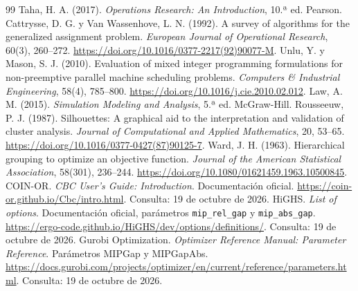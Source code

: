 \documentclass[12pt,a4paper,oneside]{article}
\begin{document}
\clearpage
{}
\begin{thebibliography}{99}\small
{} Taha, H. A. (2017). \textit{Operations Research: An Introduction}, 10.ª ed. Pearson.
 Cattrysse, D. G. y Van Wassenhove, L. N. (1992). A survey of algorithms for the generalized assignment problem. \textit{European Journal of Operational Research}, 60(3), 260--272. \url{https://doi.org/10.1016/0377-2217(92)90077-M}.
 Unlu, Y. y Mason, S. J. (2010). Evaluation of mixed integer programming formulations for non-preemptive parallel machine scheduling problems. \textit{Computers \& Industrial Engineering}, 58(4), 785--800. \url{https://doi.org/10.1016/j.cie.2010.02.012}.
 Law, A. M. (2015). \textit{Simulation Modeling and Analysis}, 5.ª ed. McGraw-Hill.
 Rousseeuw, P. J. (1987). Silhouettes: A graphical aid to the interpretation and validation of cluster analysis. \textit{Journal of Computational and Applied Mathematics}, 20, 53--65. \url{https://doi.org/10.1016/0377-0427(87)90125-7}.
 Ward, J. H. (1963). Hierarchical grouping to optimize an objective function. \textit{Journal of the American Statistical Association}, 58(301), 236--244. \url{https://doi.org/10.1080/01621459.1963.10500845}.
 COIN-OR. \textit{CBC User's Guide: Introduction}. Documentación oficial. \url{https://coin-or.github.io/Cbc/intro.html}. Consulta: 19 de octubre de 2026.
 HiGHS. \textit{List of options}. Documentación oficial, parámetros \texttt{mip\_rel\_gap} y \texttt{mip\_abs\_gap}. \url{https://ergo-code.github.io/HiGHS/dev/options/definitions/}. Consulta: 19 de octubre de 2026.
 Gurobi Optimization. \textit{Optimizer Reference Manual: Parameter Reference}. Parámetros MIPGap y MIPGapAbs. \url{https://docs.gurobi.com/projects/optimizer/en/current/reference/parameters.html}. Consulta: 19 de octubre de 2026.


\end{thebibliography}
\end{document}

